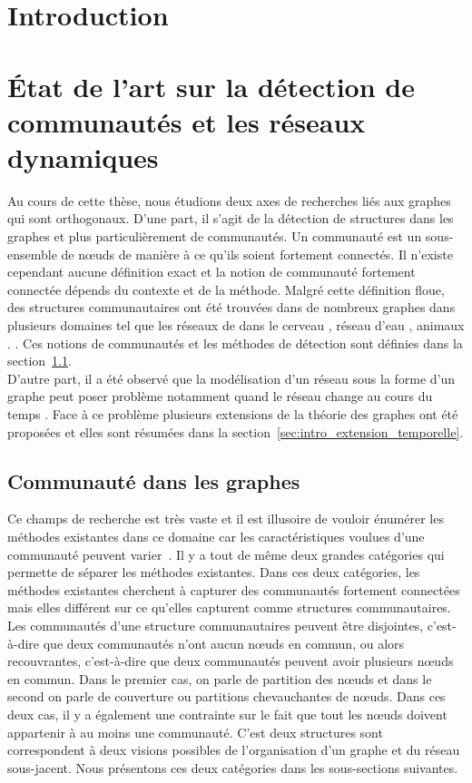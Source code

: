 
\chapter*{Introduction}

\chapter{État de l'art sur la détection de communautés et les réseaux dynamiques}
\minitoc
Au cours de cette thèse, nous étudions deux axes de recherches liés aux graphes qui sont orthogonaux.
D'une part, il s'agit de la détection de structures dans les graphes et plus particulièrement de communautés.
Un communauté est un sous-ensemble de n\oe uds de manière à ce qu'ils soient fortement connectés.
Il n'existe cependant aucune définition exact et la notion de communauté fortement connectée dépends du contexte et de la méthode.
Malgré cette définition floue, des structures communautaires ont été trouvées dans de nombreux graphes dans plusieurs domaines tel que les réseaux de dans le cerveau \cite{DeReus2014}, réseau d'eau \cite{DiNardo2015} , animaux \cite{Farine2015}\REF . \REF.
Ces notions de communautés et les méthodes de détection sont définies dans la section~\ref{sec:intro_communaute}.\\

D'autre part, il a été observé que la modélisation d'un réseau sous la forme d'un graphe peut poser problème notamment quand le réseau change au cours du temps \REF.
Face à ce problème plusieurs extensions de la théorie des graphes ont été proposées et elles sont résumées dans la section~\ref{sec:intro_extension_temporelle}.



\section{Communauté dans les graphes}
\label{sec:intro_communaute}

Ce champs de recherche est très vaste et il est illusoire de vouloir énumérer les méthodes existantes dans ce domaine car les caractéristiques voulues d'une communauté peuvent varier~\cite{Coscia2011,Leskovec2008,Yang2015,Jeub2015}.
Il y a tout de même deux grandes catégories qui permette de séparer les méthodes existantes.
Dans ces deux catégories, les méthodes existantes cherchent à capturer 
des communautés fortement connectées mais elles différent sur ce qu'elles capturent comme structures communautaires.
Les communautés d'une structure communautaires peuvent être disjointes, c'est-à-dire que deux communautés n'ont aucun n\oe uds en commun, ou alors recouvrantes, c'est-à-dire que deux communautés peuvent avoir plusieurs n\oe uds en commun.
Dans le premier cas, on parle de partition des n\oe uds et dans le second on parle de couverture ou partitions chevauchantes de n\oe uds.
Dans ces deux cas, il y a également une contrainte sur le fait que tout les n\oe uds doivent appartenir à au moins une communauté.
C'est deux structures sont correspondent à deux visions possibles de l'organisation d'un graphe et du réseau sous-jacent.
Nous présentons ces deux catégories dans les sous-sections suivantes.

